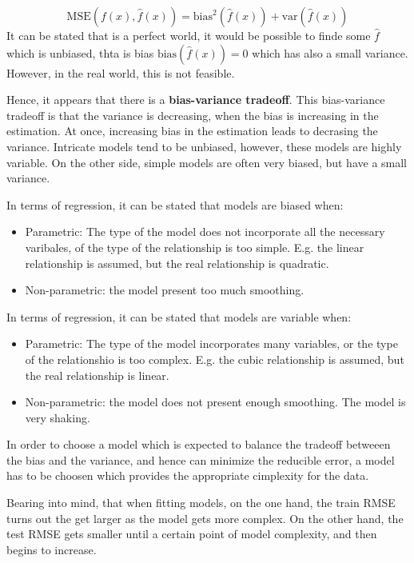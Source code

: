 \documentclass[]{report}
\begin{document}
\[
\text{MSE}\left(f(x), \hat{f}(x)\right) = \text{bias}^2 \left(\hat{f}(x) \right) + \text{var} \left(\hat{f}(x) \right)
\] It can be stated that is a perfect world, it would be possible to
finde some \(\hat{f}\) which is unbiased, thta is bias
\(\text{bias}\left(\hat{f}(x) \right) = 0\) which has also a small
variance. However, in the real world, this is not feasible.

Hence, it appears that there is a \textbf{bias-variance tradeoff}. This
bias-variance tradeoff is that the variance is decreasing, when the bias
is increasing in the estimation. At once, increasing bias in the
estimation leads to decrasing the variance. Intricate models tend to be
unbiased, however, these models are highly variable. On the other side,
simple models are often very biased, but have a small variance.

In terms of regression, it can be stated that models are biased when:

\begin{itemize}
\item
  Parametric: The type of the model does not incorporate all the
  necessary varibales, of the type of the relationship is too simple.
  E.g. the linear relationship is assumed, but the real relationship is
  quadratic.
\item
  Non-parametric: the model present too much smoothing.
\end{itemize}

In terms of regression, it can be stated that models are variable when:

\begin{itemize}
\item
  Parametric: The type of the model incorporates many variables, or the
  type of the relationshio is too complex. E.g. the cubic relationship
  is assumed, but the real relationship is linear.
\item
  Non-parametric: the model does not present enough smoothing. The model
  is very shaking.
\end{itemize}

In order to choose a model which is expected to balance the tradeoff
betweeen the bias and the variance, and hence can minimize the reducible
error, a model has to be choosen which provides the appropriate
cimplexity for the data.

Bearing into mind, that when fitting models, on the one hand, the train
RMSE turns out the get larger as the model gets more complex. On the
other hand, the test RMSE gets smaller until a certain point of model
complexity, and then begins to increase.
\end{document}

